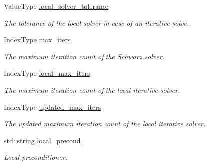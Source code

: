 \begin{DoxyCompactItemize}
Value\+Type \hyperlink{structschwz_1_1Metadata_a0fec5924fa99f07cabf560cc461887b5}{local\+\_\+solver\+\_\+tolerance}
\begin{DoxyCompactList}\small\item\em The tolerance of the local solver in case of an iterative solve. \end{DoxyCompactList}\item 
\mbox{\label{structschwz_1_1Metadata_aa3fbf70891e008cf810b6480be6607da}} 
Index\+Type \hyperlink{structschwz_1_1Metadata_aa3fbf70891e008cf810b6480be6607da}{max\+\_\+iters}
\begin{DoxyCompactList}\small\item\em The maximum iteration count of the Schwarz solver. \end{DoxyCompactList}\item 
\mbox{\label{structschwz_1_1Metadata_a54d674e16789df0e5c226ec669d0c6e4}} 
Index\+Type \hyperlink{structschwz_1_1Metadata_a54d674e16789df0e5c226ec669d0c6e4}{local\+\_\+max\+\_\+iters}
\begin{DoxyCompactList}\small\item\em The maximum iteration count of the local iterative solver. \end{DoxyCompactList}\item 
\mbox{\label{structschwz_1_1Metadata_adabb7ff33b5002eebbdca546dadaefc4}} 
Index\+Type \hyperlink{structschwz_1_1Metadata_adabb7ff33b5002eebbdca546dadaefc4}{updated\+\_\+max\+\_\+iters}
\begin{DoxyCompactList}\small\item\em The updated maximum iteration count of the local iterative solver. \end{DoxyCompactList}\item 
\mbox{\label{structschwz_1_1Metadata_a4ea47eff6a067a4a166d4236a75efe30}} 
std\+::string \hyperlink{structschwz_1_1Metadata_a4ea47eff6a067a4a166d4236a75efe30}{local\+\_\+precond}
\begin{DoxyCompactList}\small\item\em Local preconditioner. \end{DoxyCompactList}\item 
\mbox{\label{structschwz_1_1Metadata_a93978e9e4d28fac4ee80fdb5c77a7074}} 

\end{DoxyCompactItemize}

